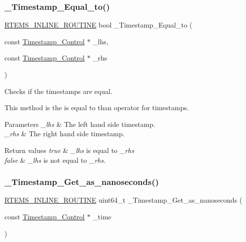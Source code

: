 \subsubsection{\texorpdfstring{\_Timestamp\_Equal\_to()}{\_Timestamp\_Equal\_to()}}
{\footnotesize\ttfamily \mbox{\hyperlink{group__RTEMSScoreBaseDefs_gac216239df231d5dbd15e3520b0b9313f}{R\+T\+E\+M\+S\+\_\+\+I\+N\+L\+I\+N\+E\+\_\+\+R\+O\+U\+T\+I\+NE}} bool \+\_\+\+Timestamp\+\_\+\+Equal\+\_\+to (\begin{DoxyParamCaption}\item[{const \mbox{\hyperlink{group__SuperCoreTimeStamp_ga8508036506d5211c98844c88045e2410}{Timestamp\+\_\+\+Control}} $\ast$}]{\+\_\+lhs,  }\item[{const \mbox{\hyperlink{group__SuperCoreTimeStamp_ga8508036506d5211c98844c88045e2410}{Timestamp\+\_\+\+Control}} $\ast$}]{\+\_\+rhs }\end{DoxyParamCaption})}



Checks if the timestamps are equal. 

This method is the is equal to than operator for timestamps.


\begin{DoxyParams}{Parameters}
{\em \+\_\+lhs} & The left hand side timestamp. \\
\hline
{\em \+\_\+rhs} & The right hand side timestamp.\\
\hline
\end{DoxyParams}

\begin{DoxyRetVals}{Return values}
{\em true} & {\itshape \+\_\+lhs} is equal to {\itshape \+\_\+rhs} \\
\hline
{\em false} & {\itshape \+\_\+lhs} is not equal to {\itshape \+\_\+rhs}. \\
\hline
\end{DoxyRetVals}
\mbox{\label{group__SuperCoreTimeStamp_ga4ad47feda7d728bdc880274b1f3dec1e}} 
\subsubsection{\texorpdfstring{\_Timestamp\_Get\_as\_nanoseconds()}{\_Timestamp\_Get\_as\_nanoseconds()}}
{\footnotesize\ttfamily \mbox{\hyperlink{group__RTEMSScoreBaseDefs_gac216239df231d5dbd15e3520b0b9313f}{R\+T\+E\+M\+S\+\_\+\+I\+N\+L\+I\+N\+E\+\_\+\+R\+O\+U\+T\+I\+NE}} uint64\+\_\+t \+\_\+\+Timestamp\+\_\+\+Get\+\_\+as\+\_\+nanoseconds (\begin{DoxyParamCaption}\item[{const \mbox{\hyperlink{group__SuperCoreTimeStamp_ga8508036506d5211c98844c88045e2410}{Timestamp\+\_\+\+Control}} $\ast$}]{\+\_\+time }\end{DoxyParamCaption})}



